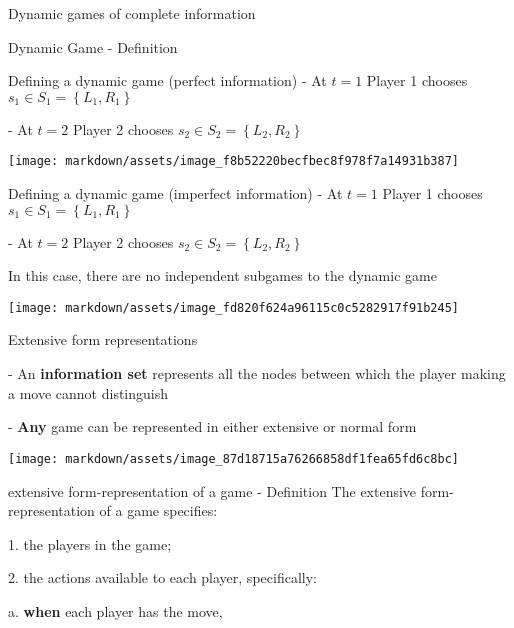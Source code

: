 \begin{titleboxchi}{Dynamic games of complete information}
\begin{definition}{Dynamic Game - Definition}
        \begin{proposition}{Defining a dynamic game (perfect information)}
            - At $t=1$ Player 1 chooses $s_{1} \in S_{1}=\left\{L_{1}, R_{1}\right\}$
            
            - At $t=2$ Player 2 chooses $s_{2} \in S_{2}=\left\{L_{2}, R_{2}\right\}$
            
            \texttt{[image: markdown/assets/image\_f8b52220becfbec8f978f7a14931b387]}
        \end{proposition}
        
        \begin{proposition}{Defining a dynamic game (imperfect information)}
            - At $t=1$ Player 1 chooses $s_{1} \in S_{1}=\left\{L_{1}, R_{1}\right\}$
            
            - At $t=2$ Player 2 chooses $s_{2} \in S_{2}=\left\{L_{2}, R_{2}\right\}$
            
            In this case, there are no independent subgames to the dynamic game
            
            \texttt{[image: markdown/assets/image\_fd820f624a96115c0c5282917f91b245]}
        \end{proposition}
    \end{definition}
    
    \begin{proposition}{Extensive form representations}
        
        
        - An \textbf{information set}
        represents all the nodes between which the player making a move cannot distinguish
        
        - \textbf{Any} game can be represented in either extensive or normal form
        
        \texttt{[image: markdown/assets/image\_87d18715a76266858df1fea65fd6c8bc]}
        
        \begin{definition}{extensive form-representation of a game - Definition}
            The extensive form-representation of a game specifies:
            
            1.
            the players in the game;
            
            2.
            the actions available to each player, specifically:
            
            a.
            \textbf{when} each player has the move,
            

\end{definition}
\end{proposition}
\end{titleboxchi}
